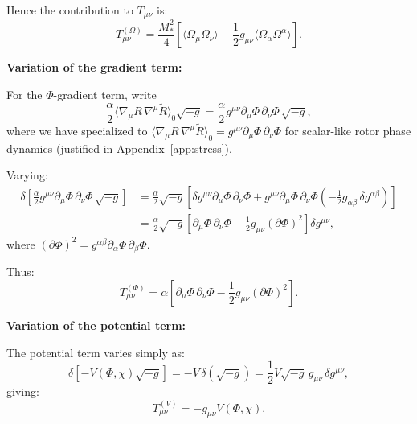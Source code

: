 \documentclass[11pt,a4paper]{article}
\numberwithin{equation}{section}
\theoremstyle{plain}
\theoremstyle{definition}
\theoremstyle{remark}
\begin{document}
Hence the contribution to $T_{\mu\nu}$ is:
\begin{equation}
T_{\mu\nu}^{(\Omega)} = \frac{M_*^2}{4}\left[\langle \Omega_\mu \Omega_\nu \rangle - \frac{1}{2}g_{\mu\nu}\langle \Omega_\alpha \Omega^\alpha \rangle\right].
\label{eq:Tmunu-Omega}
\end{equation}

\textbf{Variation of the gradient term:}

For the $\Phi$-gradient term, write
\begin{equation}
\frac{\alpha}{2}\langle \nabla_\mu R\,\nabla^\mu \widetilde{R} \rangle_0\sqrt{-g} = \frac{\alpha}{2}g^{\mu\nu}\partial_\mu\Phi\,\partial_\nu\Phi\,\sqrt{-g},
\end{equation}
where we have specialized to $\langle \nabla_\mu R\,\nabla^\mu \widetilde{R} \rangle_0 = g^{\mu\nu}\partial_\mu\Phi\,\partial_\nu\Phi$ for scalar-like rotor phase dynamics (justified in Appendix~\ref{app:stress}).

Varying:
\begin{align}
\delta\left[\frac{\alpha}{2}g^{\mu\nu}\partial_\mu\Phi\,\partial_\nu\Phi\,\sqrt{-g}\right] &= \frac{\alpha}{2}\sqrt{-g}\left[\delta g^{\mu\nu}\partial_\mu\Phi\,\partial_\nu\Phi + g^{\mu\nu}\partial_\mu\Phi\,\partial_\nu\Phi\left(-\frac{1}{2}g_{\alpha\beta}\,\delta g^{\alpha\beta}\right)\right]\\
&= \frac{\alpha}{2}\sqrt{-g}\left[\partial_\mu\Phi\,\partial_\nu\Phi - \frac{1}{2}g_{\mu\nu}(\partial\Phi)^2\right]\delta g^{\mu\nu},
\end{align}
where $(\partial\Phi)^2 = g^{\alpha\beta}\partial_\alpha\Phi\,\partial_\beta\Phi$.

Thus:
\begin{equation}
T_{\mu\nu}^{(\Phi)} = \alpha\left[\partial_\mu\Phi\,\partial_\nu\Phi - \frac{1}{2}g_{\mu\nu}(\partial\Phi)^2\right].
\label{eq:Tmunu-Phi}
\end{equation}

\textbf{Variation of the potential term:}

The potential term varies simply as:
\begin{equation}
\delta\left[-V(\Phi,\chi)\sqrt{-g}\right] = -V\,\delta(\sqrt{-g}) = \frac{1}{2}V\sqrt{-g}\,g_{\mu\nu}\,\delta g^{\mu\nu},
\end{equation}
giving:
\begin{equation}
T_{\mu\nu}^{(V)} = -g_{\mu\nu}V(\Phi,\chi).
\label{eq:Tmunu-V}
\end{equation}
\end{document}
